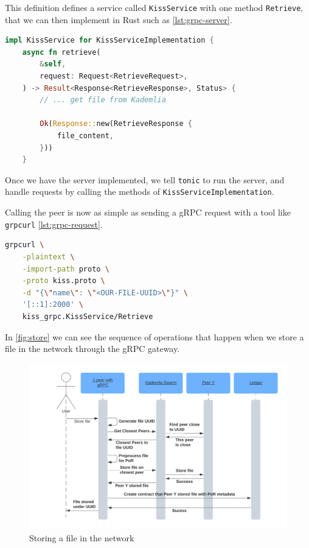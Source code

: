 This definition defines a service called \texttt{KissService} with one method \texttt{Retrieve},
that we can then implement in Rust such as \autoref{lst:grpc-server}.

\begin{lstlisting}[caption={Example of a gRPC server implementation}, label={lst:grpc-server}, language=Rust, style=colouredRust]
impl KissService for KissServiceImplementation {
    async fn retrieve(
        &self,
        request: Request<RetrieveRequest>,
    ) -> Result<Response<RetrieveResponse>, Status> {
        // ... get file from Kademlia

        Ok(Response::new(RetrieveResponse {
            file_content,
        }))
    }

\end{lstlisting}

Once we have the server implemented, we tell \texttt{tonic} to run the server,
and handle requests by calling the methods of \texttt{KissServiceImplementation}.

Calling the peer is now as simple as sending a gRPC request with a tool like \texttt{grpcurl} \autoref{lst:grpc-request}.

\begin{lstlisting}[language=bash, caption={Example of a gRPC request}, label={lst:grpc-request}]
    grpcurl \
    -plaintext \
    -import-path proto \
    -proto kiss.proto \
    -d "{\"name\": \"<OUR-FILE-UUID>\"}" \
    '[::1]:2000' \
    kiss_grpc.KissService/Retrieve
\end{lstlisting}

In \autoref{fig:store} we can see the sequence of operations that happen
when we store a file in the network through the gRPC gateway.

\begin{figure}
    \centering
    \includegraphics[width=1\textwidth]{gfx/store.png}
    \caption{Storing a file in the network}
    \label{fig:store}
\end{figure}


